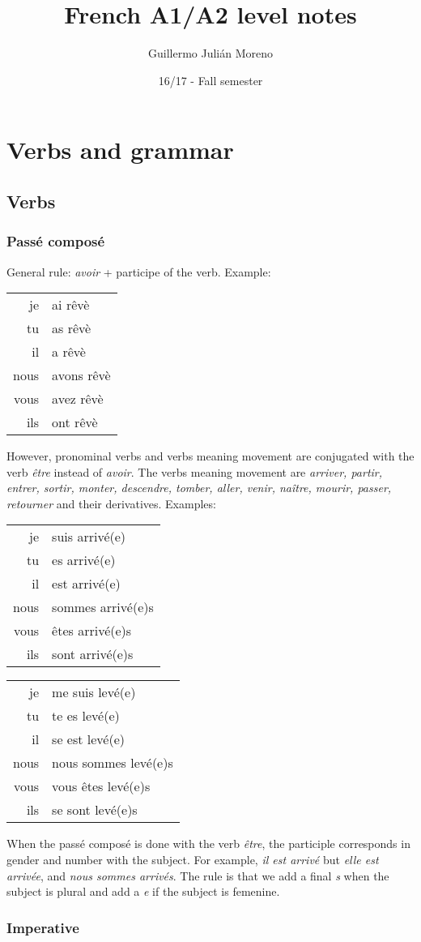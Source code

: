 \documentclass{epflnotes}
\title{French A1/A2 level notes}
\author{Guillermo Julián Moreno}
\date{16/17 - Fall semester}
\newcommand{\conjug}[6]{\begin{tabular}{rl}
je & #1 \\
tu & #2 \\
il & #3 \\
nous & #4 \\
vous & #5 \\
ils & #6 \\
\end{tabular}}
\begin{document}
\frontmatter
\maketitle

\tableofcontents
\mainmatter


\chapter{Verbs and grammar}

\section{Verbs}

\subsection{Passé composé}

General rule: \textit{avoir} + participe of the verb. Example:

\conjug
	{ai rêvè}
	{as rêvè}
	{a rêvè}
	{avons rêvè}
	{avez rêvè}
	{ont rêvè}

However, pronominal verbs and verbs meaning movement are conjugated with the verb \textit{être} instead of \textit{avoir}. The verbs meaning movement are \textit{arriver, partir, entrer, sortir, monter, descendre, tomber, aller, venir, naître, mourir, passer, retourner} and their derivatives. Examples:


\begin{minipage}{0.45\textwidth}
\centering
\conjug
	{suis arrivé(e)}
	{es arrivé(e)}
	{est arrivé(e)}
	{sommes arrivé(e)s}
	{êtes arrivé(e)s}
	{sont arrivé(e)s}
\end{minipage}
\begin{minipage}{0.45\textwidth}
\centering
\conjug
	{me suis levé(e)}
	{te es levé(e)}
	{se est levé(e)}
	{nous sommes levé(e)s}
	{vous êtes levé(e)s}
	{se sont levé(e)s}
\end{minipage}

When the passé composé is done with the verb \textit{être}, the participle corresponds in gender and number with the subject. For example, \textit{il est arrivé} but \textit{elle est arrivée}, and \textit{nous sommes arrivés}. The rule is that we add a final \textit{s} when the subject is plural and add a \textit{e} if the subject is femenine.

\subsection{Imperative}
\end{document}
